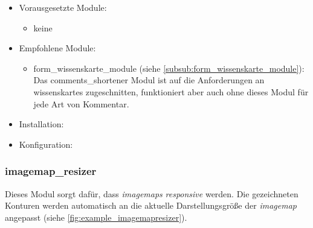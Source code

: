 \begin{itemize}[parsep=0pt, itemsep=5.0pt plus 2.0pt minus 1.0pt, leftmargin=*]
	\item Vorausgesetzte Module:

	\begin{itemize}
		\item keine
	\end{itemize}


	\item Empfohlene Module:

	\begin{itemize}
		\item form\_wissenskarte\_module (siehe \cref{subsub:form_wissenskarte_module}): Das comments\_shortener Modul ist auf die Anforderungen an \glspl{wissenskarte} zugeschnitten, funktioniert aber auch ohne dieses Modul für jede Art von Kommentar.
	\end{itemize}


	\item Installation: \standardinstall

	\item Konfiguration:

	\noconfig

\end{itemize}



\newpage
\subsubsection{imagemap\_resizer}\label{subsub:imagemapresizer}
Dieses Modul sorgt dafür, dass \textit{\glspl{imagemap}} \textit{responsive} werden. Die gezeichneten Konturen werden automatisch an die aktuelle Darstellungsgröße der \textit{\gls{imagemap}} angepasst (siehe \cref{fig:example_imagemapresizer}).


